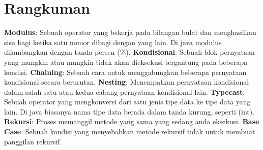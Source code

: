  \section{Rangkuman}
 \textbf{Modulus}: Sebuah operator yang bekerja pada bilangan bulat dan menghasilkan sisa bagi ketika satu nomor dibagi dengan yang lain. Di java modulus dilambangkan dengan tanda persen (\%).
  \newline
    \newline
 \textbf{Kondisional}: Sebuah blok pernyataan yang mungkin atau mungkin tidak akan dieksekusi tergantung pada beberapa kondisi.
  \newline
    \newline
 \textbf{Chaining}: Sebuah cara untuk menggabungkan beberapa pernyataan kondisional secara berurutan.
  \newline
    \newline
\textbf{Nesting}: Menempatkan pernyataan kondisional dalam salah satu atau kedua cabang pernyataan kondisional lain.
 \newline
   \newline
 \textbf{Typecast}: Sebuah operator yang mengkonversi dari satu jenis tipe data ke tipe data yang lain. Di java biasanya nama tipe data berada dalam tanda kurung, seperti (int).
  \newline
  \newline
 \textbf{Rekursi}: Proses memanggil metode yang sama yang sedang anda eksekusi.
 \newline
 \newline
 \textbf{Base Case}: Sebuah kondisi yang menyebabkan metode rekursif tidak untuk membuat panggilan rekursif.
\newline
\newline

